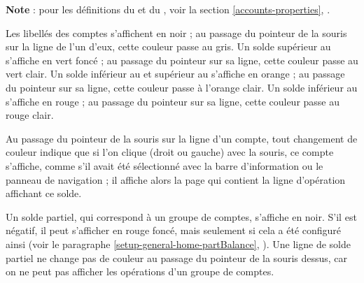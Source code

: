 
\textbf{Note} : pour les définitions du  et du , voir la section \vref{accounts-properties}, .

Les libellés des comptes s'affichent en noir{\couleur} ; au passage du pointeur de la souris sur la ligne de l'un d'eux, cette couleur passe au gris{\couleur}.
Un solde supérieur au  s'affiche en vert foncé{\couleur} ; au passage du pointeur sur sa ligne, cette couleur passe au vert clair{\couleur}.
Un solde inférieur au  et supérieur au  s'affiche en orange{\couleur} ; au passage du pointeur sur sa ligne, cette couleur passe à l'orange clair{\couleur}.
Un solde inférieur au  s'affiche en rouge{\couleur} ; au passage du pointeur sur sa ligne, cette couleur passe au rouge clair{\couleur}.

Au passage du pointeur de la souris sur la ligne d'un compte, tout changement de couleur indique que si l'on clique (droit ou gauche) avec la souris, ce compte s'affiche, comme s'il avait été sélectionné avec la barre d'information ou le panneau de navigation ; il affiche alors la page qui contient la ligne d'opération  affichant ce solde.

Un solde partiel, qui correspond à un groupe de comptes, s'affiche en noir{\couleur}. S'il est négatif, il peut s'afficher en rouge foncé{\couleur}, mais seulement si cela a été configuré ainsi (voir le paragraphe \vref{setup-general-home-partBalance}, ). Une ligne de solde partiel ne change pas de couleur au passage du pointeur de la souris dessus, car on ne peut pas afficher les opérations d'un groupe de comptes.

